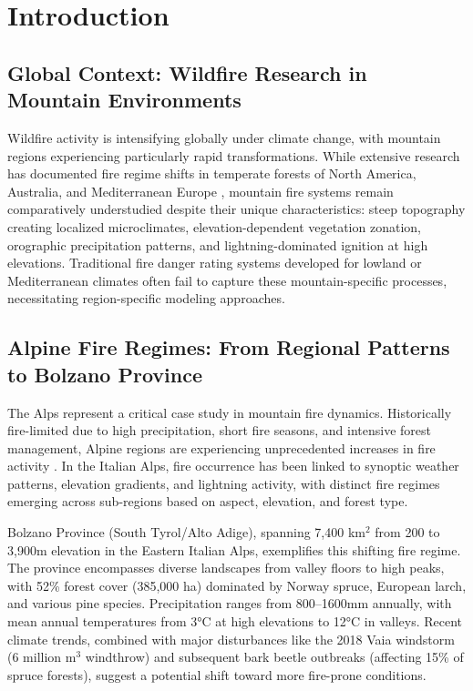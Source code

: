 \documentclass[11pt,a4paper]{article}
\begin{document}
\section{Introduction}

\subsection{Global Context: Wildfire Research in Mountain Environments}

Wildfire activity is intensifying globally under climate change, with mountain regions experiencing particularly rapid transformations. While extensive research has documented fire regime shifts in temperate forests of North America, Australia, and Mediterranean Europe \citep{Seidl2017}, mountain fire systems remain comparatively understudied despite their unique characteristics: steep topography creating localized microclimates, elevation-dependent vegetation zonation, orographic precipitation patterns, and lightning-dominated ignition at high elevations. Traditional fire danger rating systems developed for lowland or Mediterranean climates often fail to capture these mountain-specific processes, necessitating region-specific modeling approaches.

\subsection{Alpine Fire Regimes: From Regional Patterns to Bolzano Province}

The Alps represent a critical case study in mountain fire dynamics. Historically fire-limited due to high precipitation, short fire seasons, and intensive forest management, Alpine regions are experiencing unprecedented increases in fire activity \citep{Conedera2018}. In the Italian Alps, fire occurrence has been linked to synoptic weather patterns, elevation gradients, and lightning activity, with distinct fire regimes emerging across sub-regions based on aspect, elevation, and forest type.

Bolzano Province (South Tyrol/Alto Adige), spanning 7,400 km$^2$ from 200 to 3,900m elevation in the Eastern Italian Alps, exemplifies this shifting fire regime. The province encompasses diverse landscapes from valley floors to high peaks, with 52\% forest cover (385,000 ha) dominated by Norway spruce, European larch, and various pine species. Precipitation ranges from 800--1600mm annually, with mean annual temperatures from 3°C at high elevations to 12°C in valleys. Recent climate trends, combined with major disturbances like the 2018 Vaia windstorm (6 million m$^3$ windthrow) and subsequent bark beetle outbreaks (affecting 15\% of spruce forests), suggest a potential shift toward more fire-prone conditions.
\end{document}
